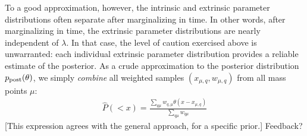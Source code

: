 To a good approximation, however, the intrinsic and extrinsic parameter distributions often separate after marginalizing
in time.  In other words, after marginalizing in time, the extrinsic parameter distributions are nearly independent of $\lambda$.  
In that case, the level of caution exercised above is unwarranted:  each individual
extrinsic parameter distribution provides a reliable estimate of the posterior.  As a crude approximation to the posterior distribution $p_{\rm post}(\theta)$, we  simply \emph{combine} all
weighted samples $(x_{\mu,q},w_{\mu,q})$ from all mass points $\mu$:
\begin{eqnarray}
\hat{P}(<x) = \frac{\sum_{q\mu} w_{q,\mu}\theta(x-x_{\mu,q})}{\sum_{q\mu} w_{q\mu}}
\end{eqnarray}
[This expression agrees with the general approach, for a specific prior.]
{\color{blue} Feedback?}


